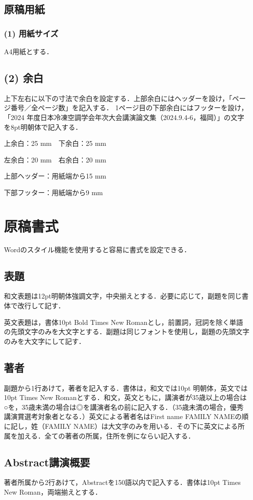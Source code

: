 \documentclass[A4,10pt,fleqn,dvipdfmx]{jarticle}
\begin{document}
\subsection{原稿用紙}
\subsubsection*{(1)  用紙サイズ}
A4用紙とする．

\subsection*{(2)  余白}
上下左右に以下の寸法で余白を設定する．上部余白にはヘッダーを設け，「ページ番号／全ページ数」を記入する． 1ページ目の下部余白にはフッターを設け，「2024 年度日本冷凍空調学会年次大会講演論文集（2024.9.4-6，福岡）」の文字を8pt明朝体で記入する．

上余白：25 mm　下余白：25 mm

左余白：20 mm　右余白：20 mm

上部ヘッダー：用紙端から15 mm

下部フッター：用紙端から9 mm

\section{原稿書式}
Wordのスタイル機能を使用すると容易に書式を設定できる．

\subsection{表題}
和文表題は12pt明朝体強調文字，中央揃えとする．必要に応じて，副題を同じ書体で改行して記す．

英文表題は，書体10pt Bold Times New Romanとし，前置詞，冠詞を除く単語の先頭文字のみを大文字とする．副題は同じフォントを使用し，副題の先頭文字のみを大文字にして記す．

\subsection{著者}
副題から1行あけて，著者を記入する．書体は，和文では10pt 明朝体，英文では10pt Times New Romanとする．和文，英文ともに，講演者が35歳以上の場合は○を，35歳未満の場合は◎を講演者名の前に記入する．（35歳未満の場合，優秀講演賞選考対象者となる．）英文による著者名はFirst name FAMILY NAMEの順に記し，姓（FAMILY NAME）は大文字のみを用いる．その下に英文による所属を加える．全ての著者の所属，住所を例にならい記入する．

\subsection{Abstract講演概要}
著者所属から2行あけて，Abstractを150語以内で記入する．書体は10pt Times New Roman，両端揃えとする．
\end{document}
